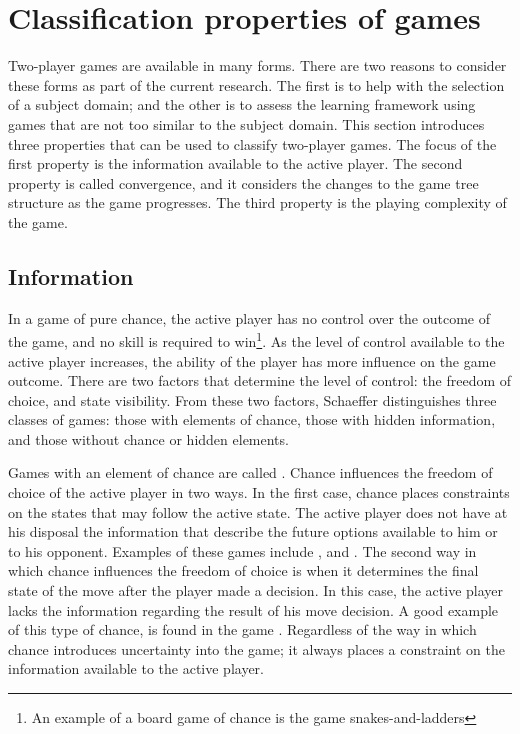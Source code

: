 \section{Classification properties of games}
\label{sec:properties}
Two-player games are available in many forms. There are two reasons to consider these forms as part of the current research.  The first is to help with the selection of a subject domain; and the other is to assess the learning framework using games that are not too similar to the subject domain.  This section introduces three properties that can be used to classify two-player games.  The focus of the first property is the information available to the active player. The second property is called convergence, and it considers the changes to the game tree structure as the game progresses. The third property is the playing complexity of the game.  

\subsection{Information}
\label{sec:perfect}
In a game of pure chance, the active player has no control over the outcome of the game, and no skill is required to win\footnote{An example of a  board game of chance is the game snakes-and-ladders}.   As the level of control available to the active player increases, the ability of the player has more influence on the game outcome.  There are two factors that determine the level of control: the freedom of choice, and state visibility. From these two factors, Schaeffer \cite{schaeffer:computers} distinguishes three classes of games: those with elements of chance, those with hidden information, and those without chance or hidden elements.  

Games with an element of chance are called . Chance influences the freedom of choice of the active player in two ways.  In the first case, chance places constraints on the states that may follow the active state.  The active player does not have at his disposal the information that describe the future options available to him or to his opponent. Examples of these games include ,  and . The second way in which chance influences the freedom of choice is when it determines the final state of the move after the player made a decision. In this case, the active player lacks the information regarding the result of his move decision.  A good example of this type of chance, is found in the game .  Regardless of the way in which chance introduces uncertainty into the game; it always places a constraint on the information available to the active player.

